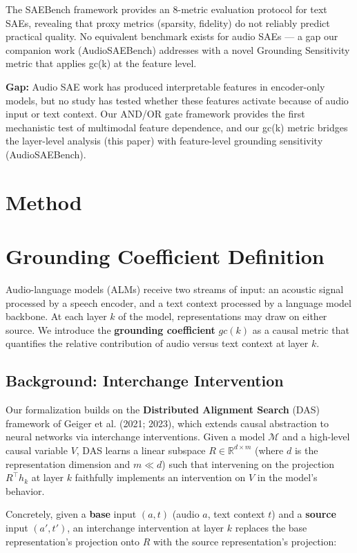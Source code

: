 \documentclass[a4paper]{article}
\begin{document}
The SAEBench framework \cite{karvonen2025} provides an 8-metric evaluation protocol for text SAEs, revealing that proxy metrics (sparsity, fidelity) do not reliably predict practical quality. No equivalent benchmark exists for audio SAEs — a gap our companion work (AudioSAEBench) addresses with a novel Grounding Sensitivity metric that applies gc(k) at the feature level.

\textbf{Gap:} Audio SAE work has produced interpretable features in encoder-only models, but no study has tested whether these features activate because of audio input or text context. Our AND/OR gate framework provides the first mechanistic test of multimodal feature dependence, and our gc(k) metric bridges the layer-level analysis (this paper) with feature-level grounding sensitivity (AudioSAEBench).


\section{Method}

\section{Grounding Coefficient Definition}

Audio-language models (ALMs) receive two streams of input: an acoustic signal processed by a speech encoder, and a text context processed by a language model backbone. At each layer $k$ of the model, representations may draw on either source. We introduce the \textbf{grounding coefficient} $gc(k)$ as a causal metric that quantifies the relative contribution of audio versus text context at layer $k$.

\subsection{Background: Interchange Intervention}

Our formalization builds on the \textbf{Distributed Alignment Search} (DAS) framework of Geiger et al. (2021; 2023), which extends causal abstraction to neural networks via interchange interventions. Given a model $\mathcal{M}$ and a high-level causal variable $V$, DAS learns a linear subspace $R \in \mathbb{R}^{d \times m}$ (where $d$ is the representation dimension and $m \ll d$) such that intervening on the projection $R^\top h_k$ at layer $k$ faithfully implements an intervention on $V$ in the model's behavior.

Concretely, given a \textbf{base} input $(a, t)$ (audio $a$, text context $t$) and a \textbf{source} input $(a', t')$, an interchange intervention at layer $k$ replaces the base representation's projection onto $R$ with the source representation's projection:
\end{document}
